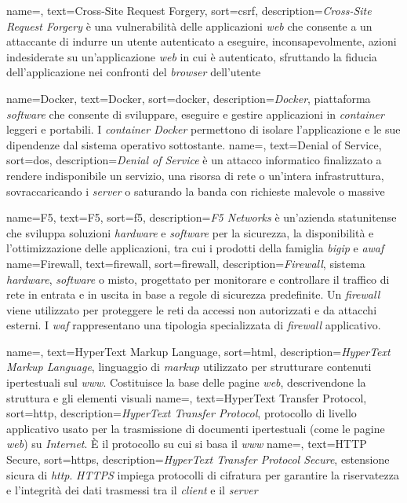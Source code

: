  {
    name=,
    text=Cross-Site Request Forgery,
    sort=csrf,
    description={\emph{Cross-Site Request Forgery} è una vulnerabilità delle applicazioni \emph{web} che consente a un attaccante di indurre un utente autenticato a eseguire, inconsapevolmente, azioni indesiderate su un'applicazione \emph{web} in cui è autenticato, sfruttando la fiducia dell'applicazione nei confronti del \emph{browser} dell'utente}
}

 {
    name=Docker,
    text=Docker,
    sort=docker,
    description={\emph{Docker}, piattaforma \emph{software} che consente di sviluppare, eseguire e gestire applicazioni in \emph{container} leggeri e portabili. I \emph{container Docker} permettono di isolare l'applicazione e le sue dipendenze dal sistema operativo sottostante.}
}
 {
    name=,
    text=Denial of Service,
    sort=dos,
    description={\emph{Denial of Service} è un attacco informatico finalizzato a rendere indisponibile un servizio, una risorsa di rete o un'intera infrastruttura, sovraccaricando i \emph{server} o saturando la banda con richieste malevole o massive}
}


 {
    name=F5,
    text=F5,
    sort=f5,
    description={\emph{F5 Networks} è un'azienda statunitense che sviluppa soluzioni \emph{hardware} e \emph{software} per la sicurezza, la disponibilità e l'ottimizzazione delle applicazioni, tra cui i prodotti della famiglia \emph{\gls{bigip}} e \emph{\gls{awaf}}}
}
 {
    name=Firewall,
    text=firewall,
    sort=firewall,
    description={\emph{Firewall}, sistema \emph{hardware}, \emph{software} o misto, progettato per monitorare e controllare il traffico di rete in entrata e in uscita in base a regole di sicurezza predefinite. Un \emph{firewall} viene utilizzato per proteggere le reti da accessi non autorizzati e da attacchi esterni. I \emph{\gls{waf}} rappresentano una tipologia specializzata di \emph{firewall} applicativo.}
}


 {
    name=,
    text=HyperText Markup Language,
    sort=html,
    description={\emph{HyperText Markup Language}, linguaggio di \emph{markup} utilizzato per strutturare contenuti ipertestuali sul \emph{\gls{www}}. Costituisce la base delle pagine \emph{web}, descrivendone la struttura e gli elementi visuali}
}
 {
    name=,
    text=HyperText Transfer Protocol,
    sort=http,
    description={\emph{HyperText Transfer Protocol}, protocollo di livello applicativo usato per la trasmissione di documenti ipertestuali (come le pagine \emph{web}) su \emph{Internet}. È il protocollo su cui si basa il \emph{\gls{www}}} 
}
 {
    name=,
    text=HTTP Secure,
    sort=https,
    description={\emph{HyperText Transfer Protocol Secure}, estensione sicura di \emph{\gls{http}}. \emph{HTTPS} impiega protocolli di cifratura per garantire la riservatezza e l'integrità dei dati trasmessi tra il \emph{client} e il \emph{server}}
}

